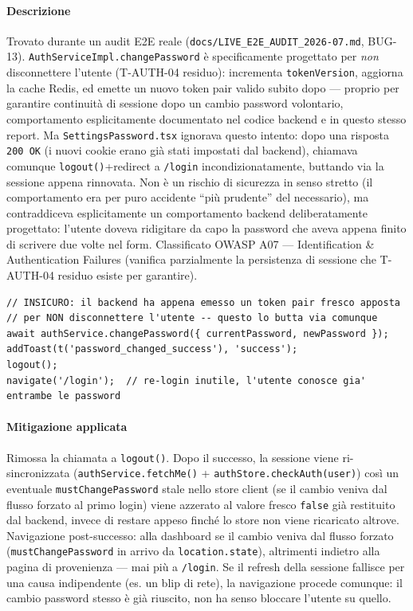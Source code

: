 ﻿\documentclass[a4paper,12pt]{report}
\begin{document}
\paragraph{Descrizione}
Trovato durante un audit E2E reale (\texttt{docs/LIVE\_E2E\_AUDIT\_2026-07.md},
BUG-13). \texttt{AuthServiceImpl.changePassword} è specificamente progettato
per \emph{non} disconnettere l'utente (T-AUTH-04 residuo): incrementa
\texttt{tokenVersion}, aggiorna la cache Redis, ed emette un nuovo token pair
valido subito dopo --- proprio per garantire continuità di sessione dopo un
cambio password volontario, comportamento esplicitamente documentato nel
codice backend e in questo stesso report. Ma \texttt{SettingsPassword.tsx}
ignorava questo intento: dopo una risposta \texttt{200 OK} (i nuovi cookie
erano già stati impostati dal backend), chiamava comunque
\texttt{logout()}+redirect a \texttt{/login} incondizionatamente, buttando via
la sessione appena rinnovata. Non è un rischio di sicurezza in senso stretto
(il comportamento era per puro accidente ``più prudente'' del necessario), ma
contraddiceva esplicitamente un comportamento backend deliberatamente
progettato: l'utente doveva ridigitare da capo la password che aveva appena
finito di scrivere due volte nel form. Classificato OWASP A07 ---
Identification \& Authentication Failures (vanifica parzialmente la
persistenza di sessione che T-AUTH-04 residuo esiste per garantire).

\begin{insecurebox}[title={Codice Vulnerabile --- SettingsPassword.tsx (baseline)}]
\begin{lstlisting}[style=java]
// INSICURO: il backend ha appena emesso un token pair fresco apposta
// per NON disconnettere l'utente -- questo lo butta via comunque
await authService.changePassword({ currentPassword, newPassword });
addToast(t('password_changed_success'), 'success');
logout();
navigate('/login');  // re-login inutile, l'utente conosce gia' entrambe le password
\end{lstlisting}
\end{insecurebox}

\paragraph{Mitigazione applicata}
Rimossa la chiamata a \texttt{logout()}. Dopo il successo, la sessione viene
ri-sincronizzata (\texttt{authService.fetchMe()} +
\texttt{authStore.checkAuth(user)}) così un eventuale \texttt{mustChangePassword}
stale nello store client (se il cambio veniva dal flusso forzato al primo
login) viene azzerato al valore fresco \texttt{false} già restituito dal
backend, invece di restare appeso finché lo store non viene ricaricato altrove.
Navigazione post-successo: alla dashboard se il cambio veniva dal flusso
forzato (\texttt{mustChangePassword} in arrivo da \texttt{location.state}),
altrimenti indietro alla pagina di provenienza --- mai più a \texttt{/login}.
Se il refresh della sessione fallisce per una causa indipendente (es. un blip
di rete), la navigazione procede comunque: il cambio password stesso è già
riuscito, non ha senso bloccare l'utente su quello.
\end{document}

